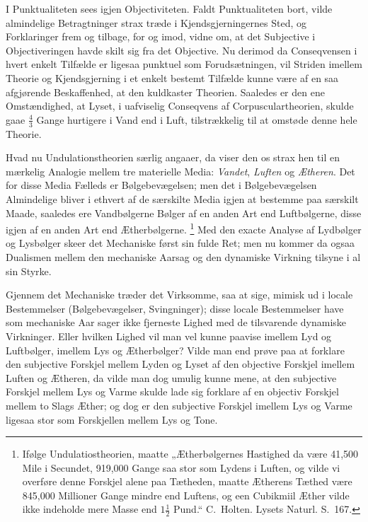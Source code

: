 \documentclass[12pt]{book}
\newcommand{\opage}[1]{\marginnote{\footnotesize\textit{[#1]}}}
\newcommand{\apage}[1]{\marginnote{\footnotesize\textit{[#1]}}}
\begin{document}
\opage{382} I Punktualiteten sees igjen Objectiviteten. Faldt Punktualiteten bort, vilde almindelige
Betragtninger strax træde i Kjendsgjerningernes Sted, og Forklaringer frem og tilbage, for og
imod, vidne om, at det Subjective i Objectiveringen havde skilt sig fra det Objective. Nu
derimod da Conseqvensen i hvert enkelt Tilfælde er ligesaa punktuel som Forudsætningen, vil
Striden imellem Theorie og Kjendsgjerning i et enkelt bestemt Tilfælde kunne være af en saa
afgjørende Beskaffenhed, at den kuldkaster Theorien. Saaledes er den ene Omstændighed, at
Lyset, i uafviselig Conseqvens af Corpusculartheorien, skulde gaae $\frac{4}{3}$ Gange
hurtigere i Vand end i Luft, tilstrækkelig til at omstøde denne hele Theorie.

Hvad nu Undulationstheorien særlig angaaer, da viser den os strax hen til en mærkelig Analogie
mellem tre materielle Media: \emph{Vandet}, \emph{Luften} og \emph{Ætheren}. Det for disse
Media Fælleds er Bølgebevægelsen; men det i Bølgebevægelsen Almindelige bliver i ethvert af de
særskilte Media igjen at bestemme paa særskilt Maade, saaledes ere Vandbølgerne Bølger af en
anden Art end Luftbølgerne, disse igjen af en anden Art end Ætherbølgerne.%
\footnote{Ifølge Undulatiostheorien, maatte „Ætherbølgernes Hastighed da være 41{,}500 Mile i
  Secundet, 919{,}000 Gange saa stor som Lydens i Luften, og vilde vi overføre denne Forskjel
  alene paa Tætheden, maatte Ætherens Tæthed være 845{,}000 Millioner Gange mindre end Luftens,
  og een Cubikmiil Æther vilde ikke indeholde mere Masse end $1\tfrac{1}{2}$ Pund.“ C.\ Holten.
  Lysets Naturl. S.~167.}
Med den exacte Analyse af Lydbølger og Lysbølger skeer det Mechaniske først sin fulde Ret; men
nu kommer da ogsaa Dualismen mellem den mechaniske Aarsag og den dynamiske Virkning tilsyne i
al sin Styrke.

Gjennem det Mechaniske træder det Virksomme, saa at sige, mimisk ud i locale Bestemmelser
(Bølgebevægelser, Svingninger); disse locale Bestemmelser have som mechaniske Aar\-%
sager \apage{383} ikke fjerneste Lighed med de tilsvarende dynamiske Virkninger. Eller hvilken Lighed vil
man vel kunne paavise imellem Lyd og Luftbølger, imellem Lys og Ætherbølger? Vilde man end
prøve paa at forklare den subjective Forskjel mellem Lyden og Lyset af den objective Forskjel
imellem Luften og Ætheren, da vilde man dog umulig kunne mene, at den subjective Forskjel
mellem Lys og Varme skulde lade sig forklare af en objectiv Forskjel mellem to Slags Æther; og
dog er den subjective Forskjel imellem Lys og Varme ligesaa stor som Forskjellen mellem Lys og
Tone.
\end{document}
